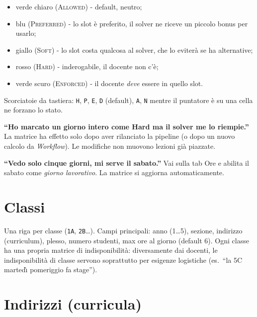 \begin{itemize}
\item \textcolor{cAllow}{verde chiaro} (\textsc{Allowed}) -
  default, neutro;
\item \textcolor{cPref}{blu} (\textsc{Preferred}) - lo slot
  \`e preferito, il solver ne riceve un piccolo bonus per
  usarlo;
\item \textcolor{cSoft}{giallo} (\textsc{Soft}) - lo slot
  costa qualcosa al solver, che lo eviter\`a se ha
  alternative;
\item \textcolor{cHard}{rosso} (\textsc{Hard}) -
  inderogabile, il docente non c'\`e;
\item \textcolor{cEnf}{verde scuro} (\textsc{Enforced}) - il
  docente \emph{deve} essere in quello slot.
\end{itemize}

Scorciatoie da tastiera: \texttt{H}, \texttt{P}, \texttt{E},
\texttt{D} (default), \texttt{A}, \texttt{N} mentre il
puntatore \`e su una cella ne forzano lo stato.

\begin{erroricomunibox}
\textbf{``Ho marcato un giorno intero come Hard ma il solver
me lo riempie.''} La matrice ha effetto solo dopo aver
rilanciato la pipeline (o dopo un nuovo calcolo da
\emph{Workflow}). Le modifiche non muovono lezioni gi\`a
piazzate.

\textbf{``Vedo solo cinque giorni, mi serve il sabato.''} Vai
sulla tab Ore e abilita il sabato come \emph{giorno
lavorativo}. La matrice si aggiorna automaticamente.
\end{erroricomunibox}

\section{Classi}
\label{sec:tab_classi}

Una riga per classe (\texttt{1A}, \texttt{2B}\dots). Campi
principali: anno (1\dots 5), sezione, indirizzo (curriculum),
plesso, numero studenti, max ore al giorno (default 6). Ogni
classe ha una propria matrice di indisponibilit\`a:
diversamente dai docenti, le indisponibilit\`a di classe
servono soprattutto per esigenze logistiche
(es.\ ``la 5C marted\`{\i} pomeriggio fa stage'').

\section{Indirizzi (curricula)}
\label{sec:tab_curricula}

